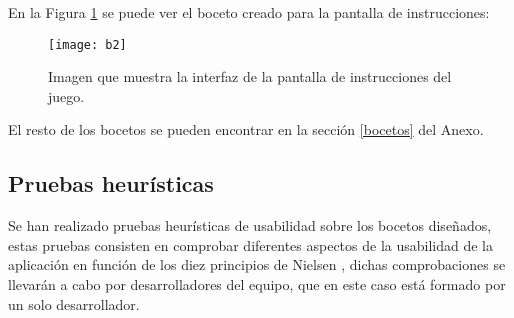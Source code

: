 \newpage

En la Figura \ref{figura-b2} se puede ver el boceto creado para la pantalla de instrucciones:

\begin{figure}[h]
  \centering
  \texttt{[image: b2]}
  \caption{Imagen que muestra la interfaz de la pantalla de instrucciones del juego.\protect\footnotemark}
  \label{figura-b2}
\end{figure}

El resto de los bocetos se pueden encontrar en la sección \ref{bocetos} del Anexo.

\subsection{Pruebas heurísticas}
Se han realizado pruebas heurísticas de usabilidad sobre los bocetos diseñados, estas pruebas consisten en comprobar diferentes aspectos de la usabilidad de la aplicación en función de los diez principios de Nielsen \cite{nielsen}, dichas comprobaciones se llevarán a cabo por desarrolladores del equipo, que en este caso está formado por un solo desarrollador.


